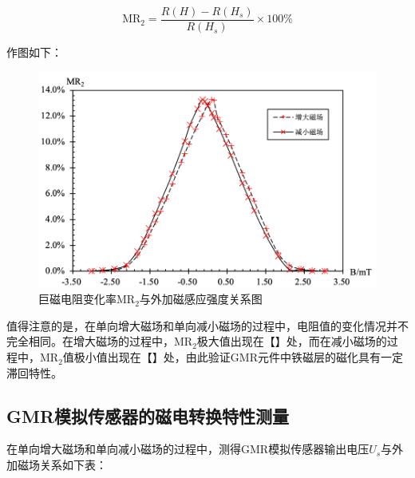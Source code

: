 \documentclass{thuemp}
\begin{document}
\begin{equation}\label{eq:mr2}
    \mathrm{MR_2} = \frac{R(H) - R(H_s)}{R(H_s)} \times 100\%
\end{equation}

作图如下：
\begin{figure}[H]
    \centering
    \includegraphics[width=1.0\linewidth]{../Data/GMR-Plot-01-02-excel.png}
    \caption{巨磁电阻变化率$\mathrm{MR_2}$与外加磁感应强度关系图} \label{fig:magnetoresistance}
\end{figure}

值得注意的是，在单向增大磁场和单向减小磁场的过程中，电阻值的变化情况并不完全相同。在增大磁场的过程中，$\mathrm{MR_2}$极大值出现在【】处，而在减小磁场的过程中，$\mathrm{MR_2}$值极小值出现在【】处，由此验证GMR元件中铁磁层的磁化具有一定滞回特性。

\subsection{GMR模拟传感器的磁电转换特性测量}

在单向增大磁场和单向减小磁场的过程中，测得GMR模拟传感器输出电压$U_s$与外加磁场关系如下表：
\end{document}
